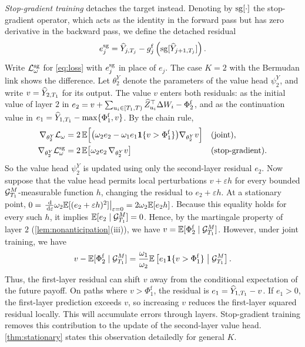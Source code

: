 \emph{Stop-gradient training} detaches the target instead. Denoting by $\operatorname{sg}[\cdot]$ the stop-gradient operator, which acts as the identity in the forward pass but has zero derivative in the backward pass, we define the detached residual
\begin{equation}\label{eq:sg-residual}
e^{\operatorname{sg}}_j=\widehat Y_{j,T_j}-g^{\mathrm f}_j\left(\operatorname{sg}[\widehat Y_{j+1,T_j}]\right).
\end{equation}
Write $\mathcal{L}^{\operatorname{sg}}_\omega$ for \eqref{eq:loss} with $e^{\operatorname{sg}}_j$ in place of $e_j$. The case $K=2$ with the Bermudan link shows the difference. Let $\theta^Y_2$ denote the parameters of the value head $\psi^Y_2$, and write $v=\widehat Y_{2,T_1}$ for its output. The value $v$ enters both residuals: as the initial value of layer $2$ in $e_2=v+\sum_{u_i\in[T_1,T)}\widehat Z_{u_i}^\top\Delta W_i-\Phi^{\mathrm f}_2$, and as the continuation value in $e_1=\widehat Y_{1,T_1}-\max\{\Phi^{\mathrm f}_1,v\}$. By the chain rule,
\begin{equation}\label{eq:grad-K2}
\begin{aligned}
\nabla_{\theta^Y_2}\mathcal{L}_\omega&=2\,\mathbb{E}\Bigl[\bigl(\omega_2e_2-\omega_1e_1\mathbf{1}\{v>\Phi^{\mathrm f}_1\}\bigr)\nabla_{\theta^Y_2}v\Bigr] &&\text{(joint)},\\
\nabla_{\theta^Y_2}\mathcal{L}^{\operatorname{sg}}_\omega&=2\,\mathbb{E}\bigl[\omega_2e_2\,\nabla_{\theta^Y_2}v\bigr] &&\text{(stop-gradient)}.
\end{aligned}
\end{equation}
So the value head $\psi^Y_2$ is updated using only the second-layer residual $e_2$. Now suppose that the value head permits local perturbations $v+\varepsilon h$ for every bounded $\mathcal{G}^M_{T_1}$-measurable function $h$, changing the residual to $e_2+\varepsilon h$. At a stationary point, $0=\left.\frac{\,\mathrm{d}}{\,\mathrm{d}\varepsilon}\omega_2\mathbb{E}[(e_2+\varepsilon h)^2]\right|_{\varepsilon=0}=2\omega_2\mathbb{E}[e_2h]$. Because this equality holds for every such $h$, it implies $\mathbb{E}[e_2\mid\mathcal{G}^M_{T_1}]=0$. Hence, by the martingale property of layer $2$ (\cref{lem:nonanticipation}(iii)), we have $v=\mathbb{E}[\Phi^{\mathrm f}_2\mid\mathcal{G}^M_{T_1}]$. However, under joint training, we have
\[
v-\mathbb{E}[\Phi^{\mathrm f}_2\mid\mathcal{G}^M_{T_1}]=\frac{\omega_1}{\omega_2}\mathbb{E}\left[e_1\mathbf{1}\{v>\Phi^{\mathrm f}_1\}\bigm|\mathcal{G}^M_{T_1}\right].
\]
Thus, the first-layer residual can shift $v$ away from the
conditional expectation of the future payoff. On paths where
$v>\Phi^{\mathrm f}_1$, the residual is $e_1=\widehat Y_{1,T_1}-v$. If $e_1>0$, the first-layer prediction exceeds $v$, so increasing $v$ reduces the first-layer squared residual locally. This will accumulate errors through layers. Stop-gradient training removes this contribution to the update of the second-layer value head.  \cref{thm:stationary} states this observation detailedly for general $K$.

